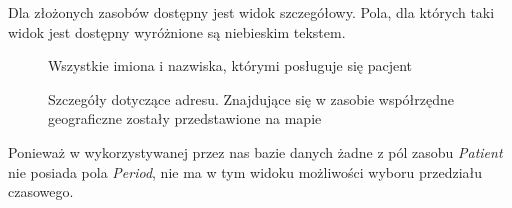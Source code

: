 \documentclass[a4paper]{article}
\begin{document}
Dla złożonych zasobów dostępny jest widok szczegółowy. Pola, dla których taki widok jest dostępny wyróżnione są niebieskim tekstem.
\begin{figure}[H]
    \caption{Wszystkie imiona i nazwiska, którymi posługuje się pacjent}
\end{figure}
\begin{figure}[H]
    \caption{Szczegóły dotyczące adresu. Znajdujące się w zasobie współrzędne geograficzne zostały przedstawione na mapie}
\end{figure}

Ponieważ w wykorzystywanej przez nas bazie danych żadne z pól zasobu \textit{Patient}
nie posiada pola \textit{Period}, nie ma w tym widoku możliwości wyboru przedziału czasowego.

\pagebreak
\end{document}
